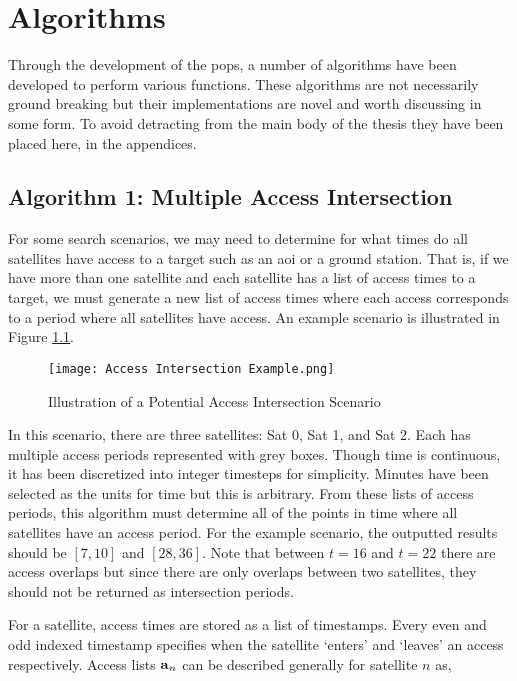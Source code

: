 \glsresetall{} 
\appendix

\chapter{Algorithms}

Through the development of the \gls{pops}, a number of algorithms have been
developed to perform various functions. These algorithms are not necessarily
ground breaking but their implementations are novel and worth discussing in
some form. To avoid detracting from the main body of the thesis they have been
placed here, in the appendices.


\section{Algorithm 1: Multiple Access Intersection} 

For some search scenarios, we may need to determine for what times do all
satellites have access to a target such as an \gls{aoi} or a ground station.
That is, if we have more than one satellite and each satellite has a list of
access times to a target, we must generate a new list of access times where
each access corresponds to a period where all satellites have access. An
example scenario is illustrated in Figure \ref{fig:access_intersect}.


\begin{figure}[h]
    \texttt{[image: Access Intersection Example.png]} 
    \caption{Illustration of a Potential Access Intersection Scenario}
\label{fig:access_intersect}
\end{figure}

In this scenario, there are three satellites: Sat 0, Sat 1, and Sat 2. Each has
multiple access periods represented with grey boxes. Though time is continuous,
it has been discretized into integer timesteps for simplicity. Minutes have
been selected as the units for time but this is arbitrary. From these lists of
access periods, this algorithm must determine all of the points in time where
all satellites have an access period. For the example scenario, the outputted
results should be $[7,10]$ and $[28,36]$. Note that between $t = 16$ and $t=22$
there are access overlaps but since there are only overlaps between two
satellites, they should not be returned as intersection periods.

For a satellite, access times are stored as a list of timestamps. Every even
and odd indexed timestamp specifies when the satellite `enters' and `leaves' an
access respectively. Access lists $\bm{\mathrm{a}}_{n}$ can be described generally for satellite $n$ as,

